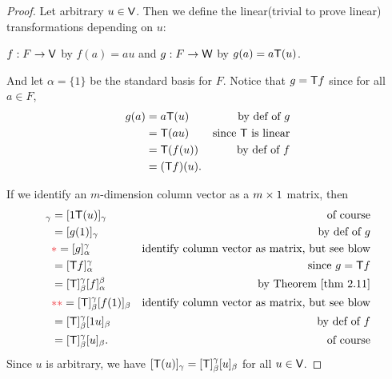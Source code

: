 \begin{proof}
Let arbitrary \(u \in \textsf{V}\).
Then we define the linear(trivial to prove linear) transformations depending on \(u\):
\begin{center}
    \(f : F \to \textsf{V}\) by \(f(a) = au\) and \(g : F \to \textsf{W}\) by \(g(a) = a\textsf{T}(u)\).
\end{center}
And let \(\alpha = \{ 1 \}\) be the standard basis for \(F\).
Notice that \(g = \textsf{T} f\) since for all \(a \in F\),
\begin{align*}
    g(a) & = a\textsf{T}(u) & \text{by def of \(g\)} \\
         & = \textsf{T}(au) & \text{since \(\textsf{T}\) is linear} \\
         & = \textsf{T}(f(u)) & \text{by def of \(f\)} \\
         & = (\textsf{T} f)(u).
\end{align*}

If we identify an \(m\)-dimension column vector as a \(m \times 1\) matrix, then
\begin{align*}
    [\T(u)]_{\gamma} & = [1\T(u)]_{\gamma} & \text{of course} \\
                     & = [g(1)]_{\gamma} & \text{by def of \(g\)} \\
                     & \RED{*}= [g]_{\alpha}^{\gamma} & \text{identify column vector as matrix, but see blow} \\
                     & = [\T f]_{\alpha}^{\gamma} & \text{since \(g = \T f\)} \\
                     & = [\T]_{\beta}^{\gamma} [f]_{\alpha}^{\beta} & \text{by \THM{2.11}} \\
                     & \RED{**}= [\T]_{\beta}^{\gamma} [f(1)]_{\beta} & \text{identify column vector as matrix, but see blow}\\
                     & = [\T]_{\beta}^{\gamma} [1u]_{\beta} & \text{by def of \(f\)} \\
                     & = [\T]_{\beta}^{\gamma}[u]_{\beta}. & \text{of course}
\end{align*}
Since \(u\) is arbitrary, we have \([\textsf{T}(u)]_{\gamma} = [\textsf{T}]_{\beta}^{\gamma}[u]_{\beta}\) for all \(u \in \textsf{V}\).


\end{proof}
